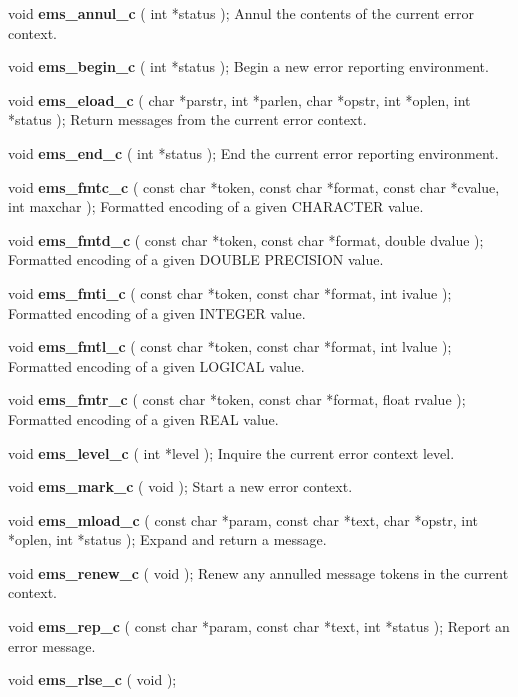 \begin {description} 
\item void {\bf ems\_annul\_c} ( int *status );
\subitem Annul the contents of the current error context.
\indexspace
\item void {\bf ems\_begin\_c} ( int *status );
\subitem Begin a new error reporting environment.
\indexspace
\item void {\bf ems\_eload\_c} ( char *parstr, int *parlen, char *opstr, 
int *oplen, int *status );
\subitem Return messages from the current error context.
\indexspace
\item void {\bf ems\_end\_c} ( int *status );
\subitem End the current error reporting environment.
\indexspace
\item void {\bf ems\_fmtc\_c} ( const char *token, const char *format, 
const char *cvalue, int maxchar );
\subitem Formatted encoding of a given CHARACTER value. 
\indexspace 
\item void {\bf ems\_fmtd\_c} ( const char *token, const char *format, 
double dvalue );
\subitem Formatted encoding of a given DOUBLE PRECISION value. 
\indexspace 
\item void {\bf ems\_fmti\_c} ( const char *token, const char *format, 
int ivalue );
\subitem Formatted encoding of a given INTEGER value. 
\indexspace 
\item void {\bf ems\_fmtl\_c} ( const char *token, const char *format, 
int lvalue );
\subitem Formatted encoding of a given LOGICAL value. 
\indexspace 
\item void {\bf ems\_fmtr\_c} ( const char *token, const char *format, 
float rvalue );
\subitem Formatted encoding of a given REAL value. 
\indexspace 
\item void {\bf ems\_level\_c} ( int *level );
\subitem Inquire the current error context level.
\indexspace
\item void {\bf ems\_mark\_c} ( void );
\subitem Start a new error context.
\indexspace
\item void {\bf ems\_mload\_c} ( const char *param, const char *text, 
char *opstr, int *oplen, int *status );
\subitem Expand and return a message. 
\indexspace 
\item void {\bf ems\_renew\_c} ( void );
\subitem Renew any annulled message tokens in the current context.
\indexspace
\item void {\bf ems\_rep\_c} ( const char *param, const char *text, 
int *status );
\subitem Report an error message.
\indexspace
\item void {\bf ems\_rlse\_c} ( void );

\end{description}
